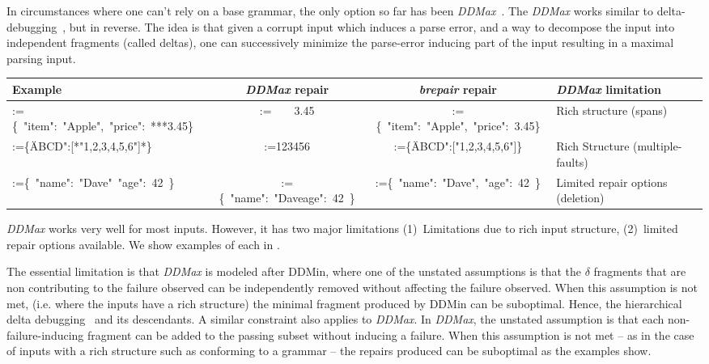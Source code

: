 \documentclass[sigconf,review,anonymous]{acmart}
\makeatletter
\newcommand{\ddmin}{\textit{ddmin}\xspace}
\def\ddmin{DDMin\xspace}
\newcommand{\ddmax}{\textit{DDMax}\xspace}
\newcommand{\brepair}{\textit{brepair}\xspace}
\newcommand\letterboxed[1]{%
\setlength{\fboxsep}{0pt}%
  \@tfor\@ii:=#1\do{%
    \fcolorbox{white}{light-gray}{\texttt{\strut\@ii}}%
  }%
}
\makeatother
\begin{document}
In circumstances where one can't rely on a base grammar, the only option so far
has been \ddmax~\cite{kirschner2020debugging}. The \ddmax works similar to
delta-debugging~\cite{zeller2002simplifying}, but in reverse. The idea
is that given a corrupt input which induces a parse error, and a way to
decompose the input into independent fragments (called deltas), one can
successively minimize the parse-error inducing part of the input resulting in a
maximal parsing input.

\begin{table*}\centering
\footnotesize
\caption{\ddmax limitations}
\begin{tabular}{|l | c | c | l |}
\hline
Example & \ddmax repair & \brepair repair & \ddmax limitation \\
\hline
\letterboxed{\{\ "item":\ "Apple",\ "price":\ ***3.45\}} & \letterboxed{\ \ \ \
3.45} & \letterboxed{\{\ "item":\ "Apple",\ "price":\ 3.45\}} & Rich structure
(spans) \\
\letterboxed{\{\"ABCD":[*"1,2,3,4,5,6"]*\}} & 
\letterboxed{123456} & 
\letterboxed{\{\"ABCD":["1,2,3,4,5,6"]\}} & 
Rich Structure (multiple-faults) \\
\letterboxed{\{\ "name":\ "Dave"\ "age":\ 42\ \}} &
\letterboxed{\{\ "name":\ "Daveage":\ 42\ \}} &
\letterboxed{\{\ "name":\ "Dave",\ "age":\ 42\ \}} &
Limited repair options (deletion) \\
\hline
\end{tabular}
\label{tab:ddmaxlimitations}
\end{table*}

\ddmax works very well for most inputs. However, it has two major limitations
(1)~Limitations due to rich input structure,
(2)~limited repair options available.
We show examples of each in .

The essential limitation is that \ddmax is modeled after \ddmin, where one of
the unstated assumptions is that the $\delta$ fragments that are non
contributing to the failure observed can be independently removed without
affecting the failure observed. When this assumption is not met, (i.e. where
the inputs have a rich structure) the minimal fragment produced by \ddmin
can be suboptimal. Hence, the hierarchical delta debugging~\cite{misherghi2006hdd}
and its descendants. A similar constraint also applies to \ddmax. In \ddmax,
the unstated assumption is that each non-failure-inducing fragment
can be added to the passing subset without inducing a failure. When this
assumption is not met -- as in the case of inputs with a rich structure such as
conforming to a grammar -- the repairs produced can be suboptimal as the
examples show.
\end{document}
